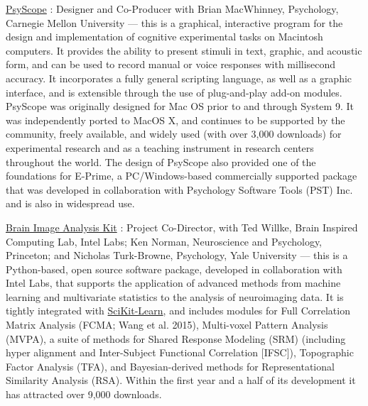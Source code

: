 \documentclass[10 pt]{article}
\begin{document}
\href{https://en.wikipedia.org/wiki/PsyScope}{PsyScope} \cite{cohen1993psyscope}: Designer and Co-Producer with Brian MacWhinney, Psychology, Carnegie Mellon University — this is a graphical, interactive program for the design and implementation of cognitive experimental tasks on Macintosh computers. It provides the ability to present stimuli in text, graphic, and acoustic form, and can be used to record manual or voice responses with millisecond accuracy. It incorporates a fully general scripting language, as well as a graphic interface, and is extensible through the use of plug-and-play add-on modules. PsyScope was originally designed for Mac OS prior to and through System 9. It was independently ported to MacOS X, and continues to be supported by the community, freely available, and widely used (with over 3,000 downloads) for experimental research and as a teaching instrument in research centers throughout the world. The design of PsyScope also provided one of the foundations for E-Prime, a PC/Windows-based commercially supported package that was developed in collaboration with Psychology Software Tools (PST) Inc. and is also in
widespread use.
    \smallskip

\href{http://BrainIAK.org}{Brain Image Analysis Kit} \cite{kumar2021brainiak}: Project Co-Director, with Ted Willke, Brain Inspired Computing Lab, Intel Labs; Ken Norman, Neuroscience and Psychology, Princeton; and Nicholas Turk-Browne, Psychology, Yale University — this is a Python-based, open source software package, developed in collaboration with Intel Labs, that supports the application of advanced methods from machine learning and multivariate statistics to the analysis of neuroimaging data. It is tightly integrated with \href{http://scikit-learn.org/}{SciKit-Learn}, and includes modules for Full Correlation Matrix Analysis (FCMA; Wang et al. 2015), Multi-voxel Pattern Analysis (MVPA), a suite of methods for Shared Response Modeling (SRM) (including hyper alignment and Inter-Subject Functional Correlation [IFSC]), Topographic Factor Analysis (TFA), and Bayesian-derived methods for Representational Similarity Analysis (RSA). Within the first year and a half of its development it has attracted over 9,000 downloads.
    \smallskip
\end{document}
